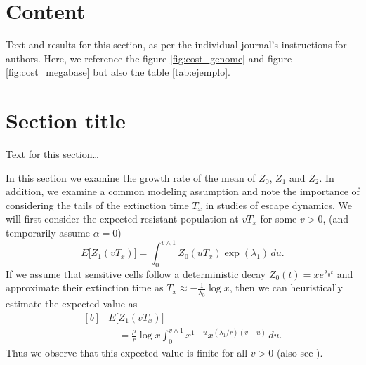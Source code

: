 \documentclass{bmcart}
\begin{document}
	\section*{Content}
		Text and results for this section, as per the individual journal's instructions for authors. Here, we reference the figure \ref{fig:cost_genome} and figure \ref{fig:cost_megabase} but also the table \ref{tab:ejemplo}.
	
	\section*{Section title}
		Text for this section\ldots

		In this section we examine the growth rate of the mean of $Z_0$, $Z_1$ and $Z_2$. In
		addition, we examine a common modeling assumption and note the
		importance of considering the tails of the extinction time $T_x$ in
		studies of escape dynamics.
		We will first consider the expected resistant population at $vT_x$ for
		some $v>0$, (and temporarily assume $\alpha=0$)
		\[
		E \bigl[Z_1(vT_x) \bigr]=
		\int_0^{v\wedge
			1}Z_0(uT_x)
		\exp (\lambda_1)\,du .
		\]
		If we assume that sensitive cells follow a deterministic decay
		$Z_0(t)=xe^{\lambda_0 t}$ and approximate their extinction time as
		$T_x\approx-\frac{1}{\lambda_0}\log x$, then we can heuristically
		estimate the expected value as
		\begin{equation}\label{eqexpmuts}
			\begin{aligned}[b]
				&      E\bigl[Z_1(vT_x)\bigr]\\
				&\quad      = \frac{\mu}{r}\log x
				\int_0^{v\wedge1}x^{1-u}x^{({\lambda_1}/{r})(v-u)}\,du .
			\end{aligned}
		\end{equation}
		Thus we observe that this expected value is finite for all $v>0$ (also see \cite{koon,xjon,marg,schn,koha,issnic}).
		
		
		
\end{document}
